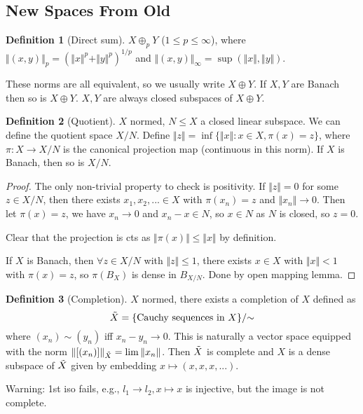 \documentclass{article}
\theoremstyle{definition}
\newtheorem{defn}{Definition}[section]
\theoremstyle{remark}
\theoremstyle{plain}
\begin{document}
\subsection{New Spaces From Old}
\begin{defn}[Direct sum]
    $X\oplus_p Y$ ($1\le p\le\infty$), where $\Vert(x,y)\Vert_p=(\Vert x\Vert^p+\Vert y\Vert^p)^{1/p}$ and $\Vert (x,y)\Vert_\infty=\sup(\Vert x\Vert,\Vert y\Vert)$.
\end{defn}
These norms are all equivalent, so we usually write $X\oplus Y$.
If $X,Y$ are Banach then so is $X\oplus Y$. $X,Y$ are always closed subspaces of $X\oplus Y$.
\begin{defn}[Quotient]
    $X$ normed, $N\le X$ a closed linear subspace. We can define the quotient space $X/N$. Define $\Vert z\Vert =\inf\{\Vert x\Vert:x\in X,\pi(x)=z\}$, where $\pi:X\to X/N$ is the canonical projection map (continuous in this norm). If $X$ is Banach, then so is $X/N$.
\end{defn}
\begin{proof}
    The only non-trivial property to check is positivity. If $\Vert z\Vert=0$ for some $z\in X/N$,
    then there exists $x_1,x_2,...\in X$  with $\pi(x_n)=z$ and $\Vert x_n\Vert\to 0$. Then let $\pi(x)=z$, we have $x_n\to 0$ and $x_n-x\in N$, so $x\in N$ as $N$ is closed, so $z=0$.

    Clear that the projection is cts as $\Vert\pi(x)\Vert\le \Vert x\Vert$ by definition.

    If $X$ is Banach, then $\forall z\in X/N$ with $\Vert z\Vert\le 1$, there exists $x\in X$ with $\Vert x\Vert <1$ with $\pi(x)=z$, so $\pi(B_X)$ is dense in $B_{X/N}$. Done by open mapping lemma.
\end{proof}

\begin{defn}[Completion]
    $X$ normed, there exists a completion of $X$ defined as
    \[\Tilde{X}=\{\text{Cauchy sequences in }X\}/{\sim}\]
    where $(x_n)\sim(y_n)$ iff $x_n-y_n\to 0$. This is naturally a vector space equipped with the norm $\Vert[(x_n)]\Vert_{\Tilde{X}}=\lim\Vert x_n\Vert$. Then $\Tilde{X}$ is complete and $X$ is a dense subspace of $\Tilde{X}$ given by embedding $x\mapsto(x,x,x,...)$.
\end{defn}
Warning: 1st iso fails, e.g., $l_1\to l_2, x\mapsto x$ is injective, but the image is not complete.
\end{document}
